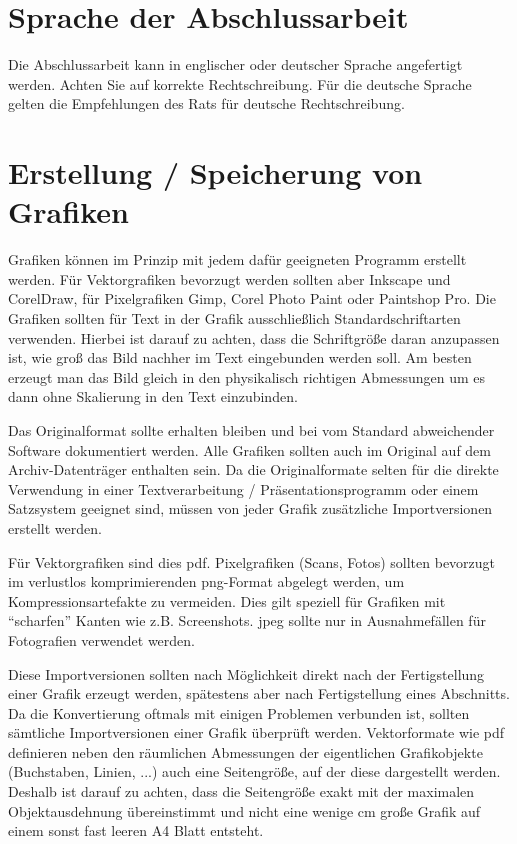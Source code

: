 \section{Sprache der Abschlussarbeit}
Die Abschlussarbeit kann in englischer oder deutscher Sprache angefertigt werden. Achten Sie auf korrekte Rechtschreibung. Für die deutsche Sprache gelten die Empfehlungen des Rats für deutsche Rechtschreibung.





\section{Erstellung / Speicherung von Grafiken\label{sec:grafik}}

Grafiken können im Prinzip mit jedem dafür geeigneten Programm erstellt werden. Für Vektorgrafiken
bevorzugt werden sollten aber Inkscape und CorelDraw, für Pixelgrafiken Gimp, Corel Photo Paint oder
Paintshop Pro. Die Grafiken sollten für Text in der Grafik ausschließlich Standardschriftarten verwenden.
Hierbei ist darauf zu achten, dass die Schriftgröße daran anzupassen ist, wie groß das Bild nachher im Text eingebunden werden soll. Am besten erzeugt man das Bild gleich in den physikalisch richtigen Abmessungen um es dann ohne Skalierung in den Text einzubinden.

Das Originalformat sollte erhalten bleiben und bei vom Standard abweichender Software dokumentiert
werden. Alle Grafiken sollten auch im Original auf dem Archiv-Datenträger enthalten sein. Da die
Originalformate selten für die direkte Verwendung in einer Textverarbeitung / Präsentationsprogramm oder einem Satzsystem geeignet sind, müssen von jeder Grafik zusätzliche Importversionen erstellt werden.

Für Vektorgrafiken sind dies pdf. Pixelgrafiken (Scans,
Fotos) sollten bevorzugt im verlustlos komprimierenden png-Format abgelegt werden, um Kompressionsartefakte zu vermeiden. Dies gilt speziell für Grafiken mit "`scharfen"' Kanten wie z.B. Screenshots. jpeg sollte nur in Ausnahmefällen für Fotografien verwendet werden. 

Diese Importversionen sollten nach Möglichkeit direkt nach der Fertigstellung einer Grafik erzeugt
werden, spätestens aber nach Fertigstellung eines Abschnitts. Da die Konvertierung
oftmals mit einigen Problemen verbunden ist, sollten sämtliche Importversionen einer Grafik
überprüft werden. Vektorformate wie pdf definieren neben den räumlichen Abmessungen der eigentlichen Grafikobjekte (Buchstaben, Linien, ...) auch eine Seitengröße, auf der diese
dargestellt werden. Deshalb ist darauf zu achten, dass die Seitengröße exakt mit der maximalen
Objektausdehnung übereinstimmt und nicht eine wenige cm große Grafik auf einem sonst fast leeren A4 Blatt entsteht. 



